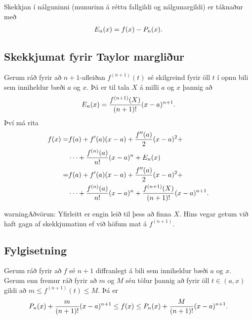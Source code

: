 \documentclass[b5paper,10pt,icelandic]{sphinxmanual}
\begin{document}
Skekkjan í nálguninni (munurinn á réttu fallgildi og nálgunargildi) er
táknaður með
\begin{gather}
\begin{split}E_n(x)=f(x)-P_n(x).\end{split}\notag
\end{gather}

\subsection{Skekkjumat fyrir Taylor margliður}
\label{kafli03:skekkjumat-fyrir-taylor-margliur}
Gerum ráð fyrir að \(n+1\)-afleiðan \(f^{(n+1)}(t)\) sé
skilgreind fyrir öll \(t\) í opnu bili sem inniheldur bæði \(a\)
og \(x\). Þá er til tala \(X\) á milli \(a\) og \(x\)
þannig að
\begin{gather}
\begin{split}E_n(x)=\frac{f^{(n+1)}(X)}{(n+1)!}(x-a)^{n+1}.\end{split}\notag
\end{gather}
Því má rita
\begin{gather}
\begin{split}\begin{aligned}
f(x)
=&f(a)+f'(a)(x-a)+\frac{f''(a)}{2}(x-a)^2+ \\
 & \cdots+\frac{f^{(n)}(a)}{n!}(x-a)^n+E_n(x)\\
=&f(a)+f'(a)(x-a)+\frac{f''(a)}{2}(x-a)^2+\\
 & \cdots+\frac{f^{(n)}(a)}{n!}(x-a)^n
  +\frac{f^{(n+1)}(X)}{(n+1)!}(x-a)^{n+1}.\end{aligned}\end{split}\notag
\end{gather}
\begin{notice}{warning}{Aðvörun:}
Yfirleitt er engin leið til þess að finna \(X\).
Hins vegar getum við haft gagn af skekkjumatinu ef
við höfum mat á \(f^{(n+1)}\).
\end{notice}


\subsection{Fylgisetning}
\label{kafli03:fylgisetning}
Gerum ráð fyrir að \(f\) sé \(n+1\) diffranlegt á bili sem
inniheldur bæði \(a\) og \(x\). Gerum enn fremur ráð fyrir að
\(m\) og \(M\) séu tölur þannig að fyrir öll \(t\in (a, x)\)
gildi að \(m\leq f^{(n+1)}(t)\leq M\). Þá er
\begin{gather}
\begin{split}P_n(x) + \frac{m}{(n+1)!}(x-a)^{n+1} \leq f(x)
\leq P_n(x) + \frac{M}{(n+1)!}(x-a)^{n+1}.\end{split}\notag
\end{gather}
\end{document}
